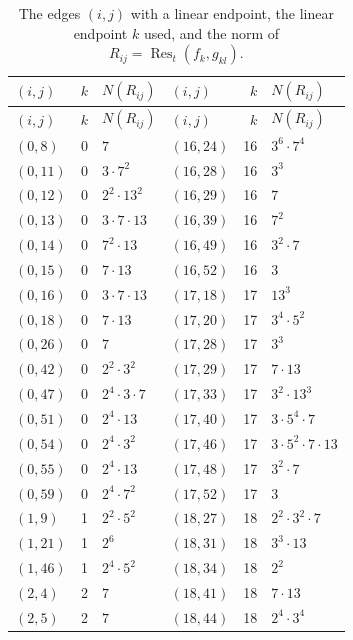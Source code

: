 \documentclass[11pt]{article}
\begin{document}
\begingroup\small
\setlength{\LTcapwidth}{\textwidth}
\begin{longtable}{@{}lrl@{\qquad}lrl@{}}
\caption{The edges $(i,j)$ with a linear endpoint, the linear endpoint $k$ used, and the norm of $R_{ij}=\operatorname{Res}_t(f_k,g_{kl})$.}\label{tab:sep}\\
\hline $(i,j)$ & $k$ & $N(R_{ij})$ & $(i,j)$ & $k$ & $N(R_{ij})$\\\hline\endfirsthead\hline $(i,j)$ & $k$ & $N(R_{ij})$ & $(i,j)$ & $k$ & $N(R_{ij})$\\\hline\endhead\hline\endfoot
$(0,8)$ & 0 & $7$ & $(16,24)$ & 16 & $3^{6}\cdot 7^{4}$\\
$(0,11)$ & 0 & $3\cdot 7^{2}$ & $(16,28)$ & 16 & $3^{3}$\\
$(0,12)$ & 0 & $2^{2}\cdot 13^{2}$ & $(16,29)$ & 16 & $7$\\
$(0,13)$ & 0 & $3\cdot 7\cdot 13$ & $(16,39)$ & 16 & $7^{2}$\\
$(0,14)$ & 0 & $7^{2}\cdot 13$ & $(16,49)$ & 16 & $3^{2}\cdot 7$\\
$(0,15)$ & 0 & $7\cdot 13$ & $(16,52)$ & 16 & $3$\\
$(0,16)$ & 0 & $3\cdot 7\cdot 13$ & $(17,18)$ & 17 & $13^{3}$\\
$(0,18)$ & 0 & $7\cdot 13$ & $(17,20)$ & 17 & $3^{4}\cdot 5^{2}$\\
$(0,26)$ & 0 & $7$ & $(17,28)$ & 17 & $3^{3}$\\
$(0,42)$ & 0 & $2^{2}\cdot 3^{2}$ & $(17,29)$ & 17 & $7\cdot 13$\\
$(0,47)$ & 0 & $2^{4}\cdot 3\cdot 7$ & $(17,33)$ & 17 & $3^{2}\cdot 13^{3}$\\
$(0,51)$ & 0 & $2^{4}\cdot 13$ & $(17,40)$ & 17 & $3\cdot 5^{4}\cdot 7$\\
$(0,54)$ & 0 & $2^{4}\cdot 3^{2}$ & $(17,46)$ & 17 & $3\cdot 5^{2}\cdot 7\cdot 13$\\
$(0,55)$ & 0 & $2^{4}\cdot 13$ & $(17,48)$ & 17 & $3^{2}\cdot 7$\\
$(0,59)$ & 0 & $2^{4}\cdot 7^{2}$ & $(17,52)$ & 17 & $3$\\
$(1,9)$ & 1 & $2^{2}\cdot 5^{2}$ & $(18,27)$ & 18 & $2^{2}\cdot 3^{2}\cdot 7$\\
$(1,21)$ & 1 & $2^{6}$ & $(18,31)$ & 18 & $3^{3}\cdot 13$\\
$(1,46)$ & 1 & $2^{4}\cdot 5^{2}$ & $(18,34)$ & 18 & $2^{2}$\\
$(2,4)$ & 2 & $7$ & $(18,41)$ & 18 & $7\cdot 13$\\
$(2,5)$ & 2 & $7$ & $(18,44)$ & 18 & $2^{4}\cdot 3^{4}$\\

\end{longtable}
\end{document}
